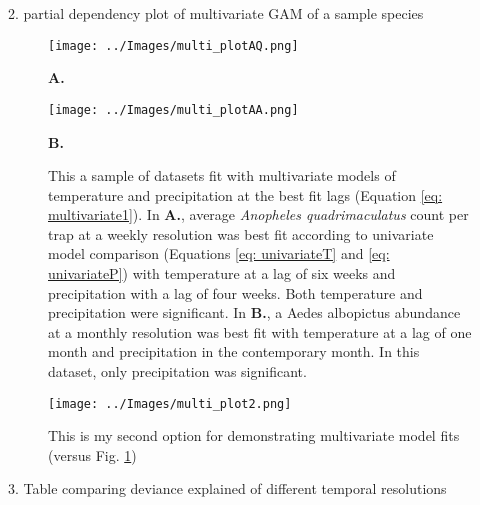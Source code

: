 2. partial dependency plot of multivariate GAM of a sample species 

\begin{figure}
	\begin{minipage}[]{0.5\textwidth}
		\texttt{[image: ../Images/multi\_plotAQ.png]}
		
		\hspace{4.5cm}\textbf{A.}\\
	\end{minipage}
	\begin{minipage}[]{0.5\textwidth}
	\texttt{[image: ../Images/multi\_plotAA.png]}
	
	\hspace{4.5cm}\textbf{B.}\\
	\end{minipage}

	\label{fig: 3Dmulti}
	\caption{This a sample of datasets fit with  multivariate models of temperature and precipitation at the best fit lags (Equation \ref{eq: multivariate1}). In \textbf{A.}, average \textit{Anopheles quadrimaculatus} count per trap at a weekly resolution was best fit according to univariate model comparison (Equations \ref{eq: univariateT} and \ref{eq: univariateP}) with temperature at a lag of six weeks and precipitation with a lag of four weeks. Both temperature and precipitation were significant. In \textbf{B.}, a Aedes albopictus abundance at a monthly resolution was best fit with temperature at a lag of one month  and precipitation in the contemporary month. In this dataset, only precipitation was significant.}

\end{figure}


\begin{figure}
	\centering
	\texttt{[image: ../Images/multi\_plot2.png]}
	\caption{This is my second option for demonstrating multivariate model fits (versus Fig. \ref{fig: 3Dmulti})}
\end{figure}

3. Table comparing deviance explained of different temporal resolutions

